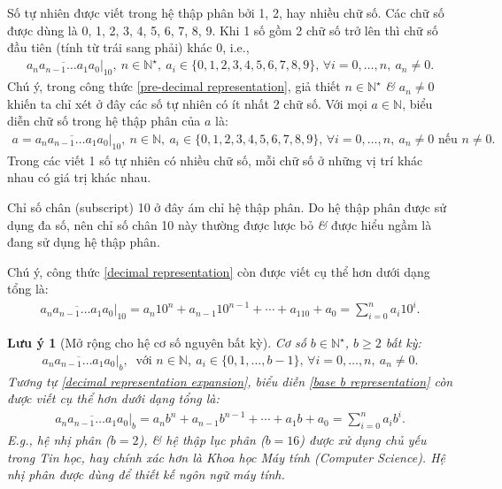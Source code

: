 \documentclass{article}
\numberwithin{equation}{section}
\newtheorem{luuy}{Lưu ý}[section]
\begin{document}
Số tự nhiên được viết trong hệ thập phân bởi 1, 2, hay nhiều chữ số. Các chữ số được dùng là 0, 1, 2, 3, 4, 5, 6, 7, 8, 9. Khi 1 số gồm 2 chữ số trở lên thì chữ số đầu tiên (tính từ trái sang phải) khác 0, i.e.,
\begin{align}
	\label{pre-decimal representation}
	\overline{a_na_{n-1}\ldots a_1a_0}|_{10},\ n\in\mathbb{N}^\star,\ a_i\in\{0,1,2,3,4,5,6,7,8,9\},\,\forall i = 0,\ldots,n,\ a_n\ne 0.
\end{align}
Chú ý, trong công thức \eqref{pre-decimal representation}, giả thiết $n\in\mathbb{N}^\star$ \textit{\&} $a_n\ne 0$ khiến ta chỉ xét ở đây các số tự nhiên có ít nhất 2 chữ số. Với mọi $a\in\mathbb{N}$, biểu diễn chữ số trong hệ thập phân của $a$ là:
\begin{align}
	\label{decimal representation}
	a = \overline{a_na_{n-1}\ldots a_1a_0}|_{10},\ n\in\mathbb{N},\ a_i\in\{0,1,2,3,4,5,6,7,8,9\},\,\forall i = 0,\ldots,n,\ a_n\ne 0\mbox{ nếu } n\ne 0.
\end{align}
Trong các viết 1 số tự nhiên có nhiều chữ số, mỗi chữ số ở những vị trí khác nhau có giá trị khác nhau.

Chỉ số chân (subscript) 10 ở đây ám chỉ hệ thập phân. Do hệ thập phân được sử dụng đa số, nên chỉ số chân 10 này thường được lược bỏ \textit{\&} được hiểu ngầm là đang sử dụng hệ thập phân.

Chú ý, công thức \eqref{decimal representation} còn được viết cụ thể hơn dưới dạng tổng là:
\begin{align}
	\label{decimal representation expansion}
	\overline{a_na_{n-1}\ldots a_1a_0}|_{10} = a_n10^n + a_{n-1}10^{n-1} + \cdots + a_110 + a_0 = \sum_{i=0}^n a_i10^i.
\end{align}

\begin{luuy}[Mở rộng cho hệ cơ số nguyên bất kỳ]
	Cơ số $b\in\mathbb{N}^\star$, $b\ge 2$ bất kỳ:
	\begin{align}
		\label{base b representation}
		\overline{a_na_{n-1}\ldots a_1a_0}|_{b},\ \mbox{ với } n\in\mathbb{N},\ a_i\in\{0,1,\ldots,b - 1\},\,\forall i = 0,\ldots,n,\ a_n\ne 0.
	\end{align}
	Tương tự \eqref{decimal representation expansion}, biểu diễn \eqref{base b representation} còn được viết cụ thể hơn dưới dạng tổng là:
	\begin{align}
		\label{base b representation expansion}
		\overline{a_na_{n-1}\ldots a_1a_0}|_{b} = a_nb^n + a_{n-1}b^{n-1} + \cdots + a_1b + a_0 = \sum_{i=0}^n a_ib^i.
	\end{align}
	E.g., hệ nhị phân ($b = 2$), \textit{\&} hệ thập lục phân ($b = 16$) được xử dụng chủ yếu trong Tin học, hay chính xác hơn là Khoa học Máy tính (Computer Science). Hệ nhị phân được dùng để thiết kế ngôn ngữ máy tính.
\end{luuy}
\end{document}

